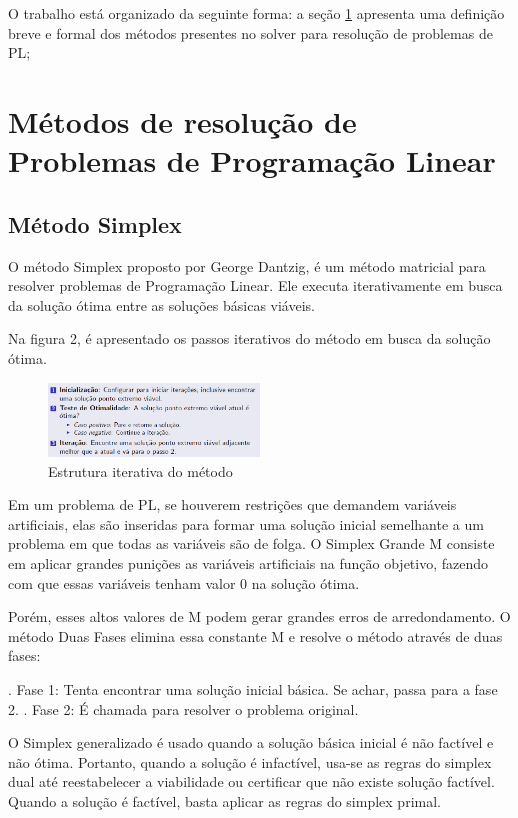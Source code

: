 \documentclass [11pt]{articleSBPO}
\begin{document}
O trabalho está organizado da seguinte forma: a seção \ref{sec:metodos} apresenta uma definição breve e formal dos métodos presentes no solver para resolução de problemas de PL;


\section{Métodos de resolução de Problemas de Programação Linear}
\label{sec:metodos}

\subsection{Método Simplex}

O método Simplex proposto por George Dantzig, é um método matricial para resolver problemas de Programação Linear. Ele executa iterativamente em busca da solução ótima entre as soluções básicas viáveis. 

Na figura 2, é apresentado os passos iterativos do método em busca da solução ótima.

\begin{figure}[!h]
\centering
\includegraphics[width=0.5\textwidth]{img/img1.png}
\caption[]{Estrutura iterativa do método}
\label{fig:figura1}
\end{figure}

Em um problema de PL, se houverem restrições que demandem variáveis artificiais, elas são inseridas para formar uma solução inicial semelhante a um problema em que todas as variáveis são de folga. O Simplex Grande M consiste em aplicar grandes punições as variáveis artificiais na função objetivo, fazendo com que essas variáveis tenham valor 0 na solução ótima.

Porém, esses altos valores de M podem gerar grandes erros de arredondamento. O método Duas Fases elimina essa constante M e resolve o método através de duas fases:

. Fase 1: Tenta encontrar uma solução inicial básica. Se achar, passa para a fase 2.
. Fase 2: É chamada para resolver o problema original.

O Simplex generalizado é usado quando a solução básica inicial é não factível e não ótima. Portanto, quando a solução é infactível, usa-se as regras do simplex dual até reestabelecer a viabilidade ou certificar que não existe solução factível. Quando a solução é factível, basta aplicar as regras do simplex primal.
\end{document}
